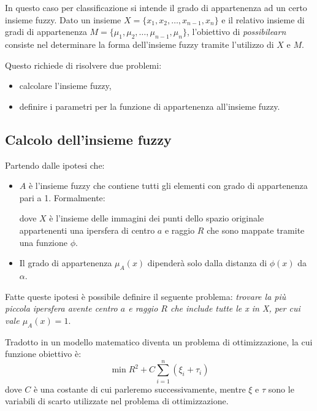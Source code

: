 \documentclass[12pt,italian]{report}
\begin{document}
In questo caso per classificazione si intende il grado di appartenenza ad un certo insieme fuzzy. 
Dato un insieme $ X = \{ x_{1}, x_{2}, \ldots, x_{n-1}, x_{n}\} $ e il relativo insieme di gradi di appartenenza $ M = \{\mu_{1}, \mu_{2}, \ldots, \mu_{n-1}, \mu_{n}\} $, l'obiettivo di \emph{possibilearn} consiste nel determinare la forma dell'insieme fuzzy tramite l'utilizzo di $ X $ e $ M $.

\pagebreak
Questo richiede di risolvere due problemi:
\begin{itemize}
	\item calcolare l'insieme fuzzy,
	\item definire i parametri per la funzione di appartenenza all'insieme fuzzy.
\end{itemize}

\subsection {Calcolo dell'insieme fuzzy}
Partendo dalle ipotesi che:
\begin{itemize}
	\item $ A $ è l'insieme fuzzy che contiene tutti gli elementi con grado di appartenenza pari a 1. Formalmente:
	\begin{center}
	\end{center}
	dove $ X $ è l'insieme delle immagini dei punti dello spazio originale appartenenti una ipersfera di centro $a$ e raggio $ R $ che sono mappate tramite una funzione $\phi$.
	
	\item Il grado di appartenenza $ \mu_{A}(x) $ dipenderà solo dalla distanza di $ \phi(x) $ da $ \alpha $.
\end{itemize}

Fatte queste ipotesi è possibile definire il seguente problema:
\emph{trovare la più piccola ipersfera avente centro $a$ e raggio $R$ che include tutte le x in X, per cui vale $ \mu_{A}(x) = 1 $}.


Tradotto in un modello matematico diventa un problema di ottimizzazione, la cui funzione obiettivo è:
\[ \min R^2 + C\sum_{i=1}^{n} (\xi_{i} + \tau_{i}) \]
dove $ C $ è una costante di cui parleremo successivamente, mentre $ \xi $ e $ \tau $ sono le variabili di scarto utilizzate nel problema di ottimizzazione.
\end{document}
